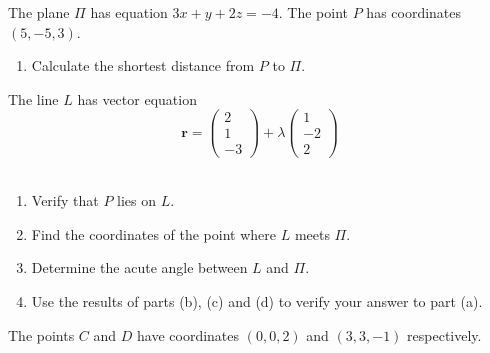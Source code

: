 \documentclass[leqno]{article}
\begin{document}
\djsFrontMatter
\begin{enumerate}[
  label=\textbf{\arabic*.},
  leftmargin=*,
  topsep=0pt,
  partopsep=0pt,
  parsep=0pt
]

\questionitem

The plane $\Pi$ has equation $3x+y+2z=-4$. The point $P$ has coordinates $(5,-5,3)$. \\
\begin{enumerate}[label=\textbf{(\alph*)}]
  \item Calculate the shortest distance from $P$ to $\Pi$.  \\
\end{enumerate}
The line $L$ has vector equation
\[
\mathbf{r}=\begin{pmatrix}2\\1\\-3\end{pmatrix}+\lambda\begin{pmatrix}1\\-2\\2\end{pmatrix}
\] \\
\begin{enumerate}[label=\textbf{(\alph*)}, resume]
  \item Verify that $P$ lies on $L$.  \\
  \item Find the coordinates of the point where $L$ meets $\Pi$.  \\
  \item Determine the acute angle between $L$ and $\Pi$.  \\
  \item Use the results of parts (b), (c) and (d) to verify your answer to part (a).  \\
\end{enumerate}

\newpage

\questionitem

The points $C$ and $D$ have coordinates $(0,0,2)$ and $(3,3,-1)$ respectively.\\


\end{enumerate}
\end{document}
